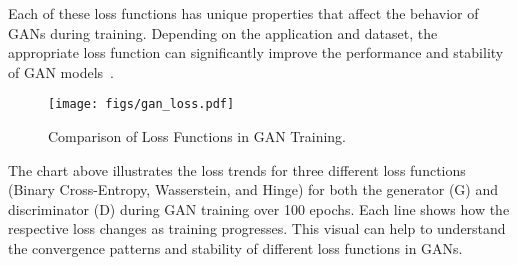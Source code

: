 Each of these loss functions has unique properties that affect the behavior of GANs during training. Depending on the application and dataset, the appropriate loss function can significantly improve the performance and stability of GAN models~\cite{zhang2019self}.

\begin{figure}[h]
    \centering
    \texttt{[image: figs/gan\_loss.pdf]}
    \caption{Comparison of Loss Functions in GAN Training.}
\end{figure}

The chart above illustrates the loss trends for three different loss functions (Binary Cross-Entropy, Wasserstein, and Hinge) for both the generator (G) and discriminator (D) during GAN training over 100 epochs. Each line shows how the respective loss changes as training progresses. This visual can help to understand the convergence patterns and stability of different loss functions in GANs.